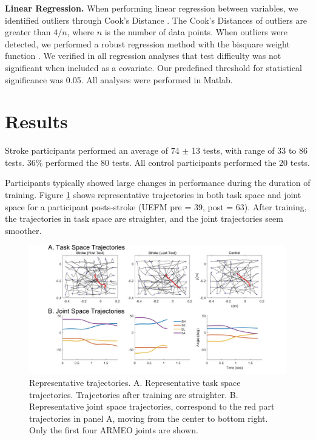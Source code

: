 \textbf{Linear Regression.}
When performing linear regression between variables, we identified outliers through Cook’s Distance \cite{Cook1977}. 
The Cook’s Distances of outliers are greater than $ 4/n $, where $ n $ is the number of data points. 
When outliers were detected, we performed a robust regression method with the bisquare weight function \cite{Hoaglin1983}. 
We verified in all regression analyses that test difficulty was not significant when included as a covariate. 
Our predefined threshold for statistical significance was 0.05. 
All analyses were performed in Matlab.

\section{Results}

Stroke participants performed an average of 74 $\pm$ 13 tests, with range of 33 to 86 tests. 
36\% performed the 80 tests. 
All control participants performed the 20 tests.

Participants typically showed large changes in performance during the duration of training. 
Figure \ref{fig:2stroketrajexamp} shows representative trajectories in both task space and joint space for a participant posts-stroke (UEFM pre = 39, post = 63). 
After training, the trajectories in task space are straighter, and the joint trajectories seem smoother.

\begin{figure}
	\centering
	\includegraphics[width=1\linewidth]{figures/2strokeTrajExamp}
	\caption[Representative trajectories]
	{Representative trajectories. 
		A. Representative task space trajectories. Trajectories after training are straighter.
		B. Representative joint space trajectories, correspond to the red part trajectories in panel A, moving from the center to bottom right. Only the first four ARMEO joints are shown.}
	\label{fig:2stroketrajexamp}
\end{figure}

